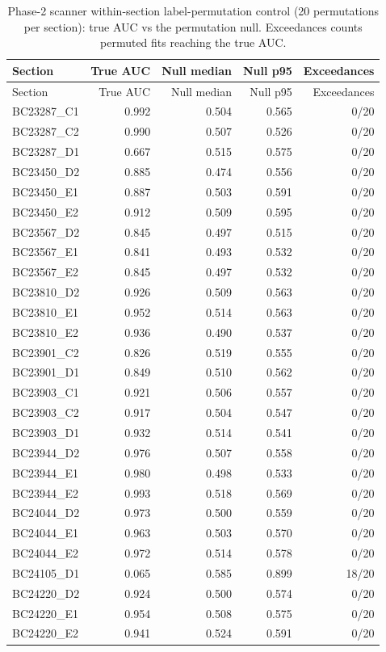 \begin{longtable}{lrrrr}
\caption{Phase-2 scanner within-section label-permutation control (20 permutations per section): true AUC vs the permutation null. Exceedances counts permuted fits reaching the true AUC.}\label{tab:scannerperm} \\
\toprule Section & True AUC & Null median & Null p95 & Exceedances \\
\midrule\endfirsthead
\toprule Section & True AUC & Null median & Null p95 & Exceedances \\
\midrule\endhead
BC23287\_C1 & 0.992 & 0.504 & 0.565 & 0/20 \\
BC23287\_C2 & 0.990 & 0.507 & 0.526 & 0/20 \\
BC23287\_D1 & 0.667 & 0.515 & 0.575 & 0/20 \\
BC23450\_D2 & 0.885 & 0.474 & 0.556 & 0/20 \\
BC23450\_E1 & 0.887 & 0.503 & 0.591 & 0/20 \\
BC23450\_E2 & 0.912 & 0.509 & 0.595 & 0/20 \\
BC23567\_D2 & 0.845 & 0.497 & 0.515 & 0/20 \\
BC23567\_E1 & 0.841 & 0.493 & 0.532 & 0/20 \\
BC23567\_E2 & 0.845 & 0.497 & 0.532 & 0/20 \\
BC23810\_D2 & 0.926 & 0.509 & 0.563 & 0/20 \\
BC23810\_E1 & 0.952 & 0.514 & 0.563 & 0/20 \\
BC23810\_E2 & 0.936 & 0.490 & 0.537 & 0/20 \\
BC23901\_C2 & 0.826 & 0.519 & 0.555 & 0/20 \\
BC23901\_D1 & 0.849 & 0.510 & 0.562 & 0/20 \\
BC23903\_C1 & 0.921 & 0.506 & 0.557 & 0/20 \\
BC23903\_C2 & 0.917 & 0.504 & 0.547 & 0/20 \\
BC23903\_D1 & 0.932 & 0.514 & 0.541 & 0/20 \\
BC23944\_D2 & 0.976 & 0.507 & 0.558 & 0/20 \\
BC23944\_E1 & 0.980 & 0.498 & 0.533 & 0/20 \\
BC23944\_E2 & 0.993 & 0.518 & 0.569 & 0/20 \\
BC24044\_D2 & 0.973 & 0.500 & 0.559 & 0/20 \\
BC24044\_E1 & 0.963 & 0.503 & 0.570 & 0/20 \\
BC24044\_E2 & 0.972 & 0.514 & 0.578 & 0/20 \\
BC24105\_D1 & 0.065 & 0.585 & 0.899 & 18/20 \\
BC24220\_D2 & 0.924 & 0.500 & 0.574 & 0/20 \\
BC24220\_E1 & 0.954 & 0.508 & 0.575 & 0/20 \\
BC24220\_E2 & 0.941 & 0.524 & 0.591 & 0/20 \\
\bottomrule
\end{longtable}
